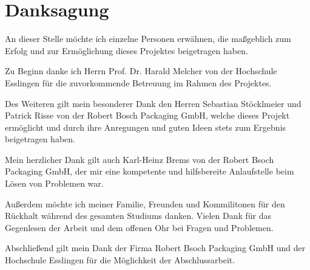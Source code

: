 \chapter*{Danksagung}
\thispagestyle{empty}

An dieser Stelle möchte ich einzelne Personen erwähnen, die maßgeblich zum Erfolg und zur Ermöglichung dieses Projektes
beigetragen haben.

Zu Beginn danke ich Herrn Prof. Dr. Harald Melcher von der Hochschule Esslingen für die zuvorkommende Betreuung im Rahmen
des Projektes.

Des Weiteren gilt mein besonderer Dank den Herren Sebastian Stöcklmeier und Patrick Risse von der Robert Bosch Packaging
GmbH, welche dieses Projekt ermöglicht und durch ihre Anregungen und guten Ideen stets zum Ergebnis beigetragen haben.

Mein herzlicher Dank gilt auch Karl-Heinz Brems von der Robert Bsoch Packaging GmbH, der mir eine kompetente und
hilfsbereite Anlaufstelle beim Lösen von Problemen war.

Außerdem möchte ich meiner Familie, Freunden und Kommilitonen für den Rückhalt während des gesamten Studiums danken.
Vielen Dank für das Gegenlesen der Arbeit und dem offenen Ohr bei Fragen und Problemen.

Abschließend gilt mein Dank der Firma Robert Bsoch Packaging GmbH und der Hochschule Esslingen für die Möglichkeit der
Abschlussarbeit.